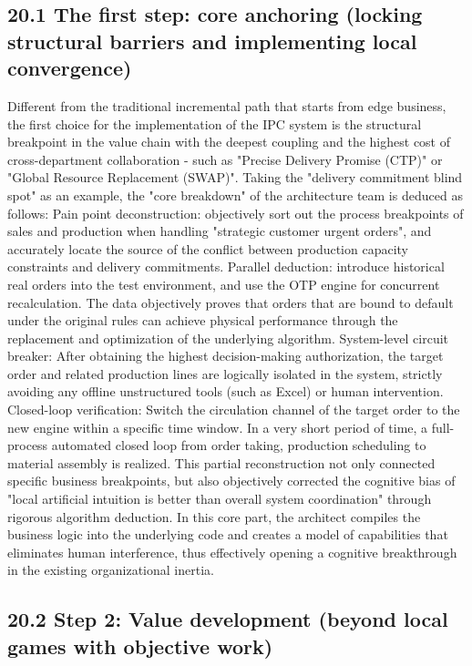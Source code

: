 \documentclass[11pt,a4paper]{article}
\begin{document}
\subsection*{20.1 The first step: core anchoring (locking structural barriers and implementing local convergence)}


Different from the traditional incremental path that starts from edge business, the first choice for the implementation of the IPC system is the structural breakpoint in the value chain with the deepest coupling and the highest cost of cross-department collaboration - such as "Precise Delivery Promise (CTP)" or "Global Resource Replacement (SWAP)". Taking the "delivery commitment blind spot" as an example, the "core breakdown" of the architecture team is deduced as follows: Pain point deconstruction: objectively sort out the process breakpoints of sales and production when handling "strategic customer urgent orders", and accurately locate the source of the conflict between production capacity constraints and delivery commitments. Parallel deduction: introduce historical real orders into the test environment, and use the OTP engine for concurrent recalculation. The data objectively proves that orders that are bound to default under the original rules can achieve physical performance through the replacement and optimization of the underlying algorithm. System-level circuit breaker: After obtaining the highest decision-making authorization, the target order and related production lines are logically isolated in the system, strictly avoiding any offline unstructured tools (such as Excel) or human intervention. Closed-loop verification: Switch the circulation channel of the target order to the new engine within a specific time window. In a very short period of time, a full-process automated closed loop from order taking, production scheduling to material assembly is realized. This partial reconstruction not only connected specific business breakpoints, but also objectively corrected the cognitive bias of "local artificial intuition is better than overall system coordination" through rigorous algorithm deduction. In this core part, the architect compiles the business logic into the underlying code and creates a model of capabilities that eliminates human interference, thus effectively opening a cognitive breakthrough in the existing organizational inertia.


\subsection*{20.2 Step 2: Value development (beyond local games with objective work)}
\end{document}
